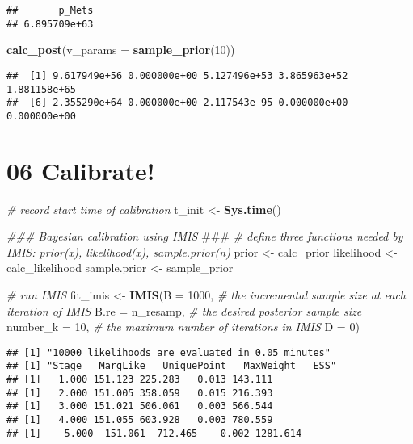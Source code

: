 \documentclass[
]{article}
\newenvironment{Shaded}{\begin{snugshade}}{\end{snugshade}}
\newcommand{\AlertTok}[1]{\textcolor[rgb]{0.94,0.16,0.16}{#1}}
\newcommand{\CommentTok}[1]{\textcolor[rgb]{0.56,0.35,0.01}{\textit{#1}}}
\newcommand{\DataTypeTok}[1]{\textcolor[rgb]{0.13,0.29,0.53}{#1}}
\newcommand{\DecValTok}[1]{\textcolor[rgb]{0.00,0.00,0.81}{#1}}
\newcommand{\KeywordTok}[1]{\textcolor[rgb]{0.13,0.29,0.53}{\textbf{#1}}}
\newcommand{\NormalTok}[1]{#1}
\newcommand{\StringTok}[1]{\textcolor[rgb]{0.31,0.60,0.02}{#1}}
\begin{document}
\begin{verbatim}
##       p_Mets 
## 6.895709e+63
\end{verbatim}

\begin{Shaded}
\begin{Highlighting}[]
\KeywordTok{calc_post}\NormalTok{(}\DataTypeTok{v_params =} \KeywordTok{sample_prior}\NormalTok{(}\DecValTok{10}\NormalTok{))}
\end{Highlighting}
\end{Shaded}

\begin{verbatim}
##  [1] 9.617949e+56 0.000000e+00 5.127496e+53 3.865963e+52 1.881158e+65
##  [6] 2.355290e+64 0.000000e+00 2.117543e-95 0.000000e+00 0.000000e+00
\end{verbatim}

\hypertarget{calibrate}{%
\section{06 Calibrate!}\label{calibrate}}

\begin{Shaded}
\begin{Highlighting}[]
\CommentTok{# record start time of calibration}
\NormalTok{t_init <-}\StringTok{ }\KeywordTok{Sys.time}\NormalTok{()}

\CommentTok{###  Bayesian calibration using IMIS  }\AlertTok{###}
\CommentTok{# define three functions needed by IMIS: prior(x), likelihood(x), sample.prior(n)}
\NormalTok{prior <-}\StringTok{ }\NormalTok{calc_prior}
\NormalTok{likelihood <-}\StringTok{ }\NormalTok{calc_likelihood}
\NormalTok{sample.prior <-}\StringTok{ }\NormalTok{sample_prior}

\CommentTok{# run IMIS}
\NormalTok{fit_imis <-}\StringTok{ }\KeywordTok{IMIS}\NormalTok{(}\DataTypeTok{B =} \DecValTok{1000}\NormalTok{, }\CommentTok{# the incremental sample size at each iteration of IMIS}
                 \DataTypeTok{B.re =}\NormalTok{ n_resamp, }\CommentTok{# the desired posterior sample size}
                 \DataTypeTok{number_k =} \DecValTok{10}\NormalTok{, }\CommentTok{# the maximum number of iterations in IMIS}
                 \DataTypeTok{D =} \DecValTok{0}\NormalTok{) }
\end{Highlighting}
\end{Shaded}

\begin{verbatim}
## [1] "10000 likelihoods are evaluated in 0.05 minutes"
## [1] "Stage   MargLike   UniquePoint   MaxWeight   ESS"
## [1]   1.000 151.123 225.283   0.013 143.111
## [1]   2.000 151.005 358.059   0.015 216.393
## [1]   3.000 151.021 506.061   0.003 566.544
## [1]   4.000 151.055 603.928   0.003 780.559
## [1]    5.000  151.061  712.465    0.002 1281.614
\end{verbatim}
\end{document}
